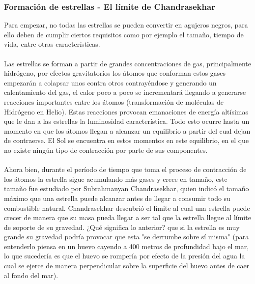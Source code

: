 \documentclass[12pt]{article}
\begin{document}
\subsubsection{Formación de estrellas - El límite de Chandrasekhar}
Para empezar, no todas las estrellas se pueden convertir en agujeros negros, para ello deben de cumplir ciertos requisitos como por ejemplo el tamaño, tiempo de vida, entre otras características.
\\\\
Las estrellas se forman a partir de grandes concentraciones de gas, principalmente hidrógeno, por efectos gravitatorios los átomos que conforman estos gases empezarán a colapsar unos contra otros contrayéndose y generando un calentamiento del gas, el calor poco a poco se incrementará llegando a generarse reacciones importantes entre los átomos (transformación de moléculas de Hidrógeno en Helio). Estas reacciones provocan emanaciones de energía altísimas que le dan a las estrellas la luminosidad característica. Todo esto ocurre hasta un momento en que los átomos llegan a alcanzar un equilibrio a partir del cual dejan de contraerse. El Sol se encuentra en estos momentos en este equilibrio, en el que no existe ningún tipo de contracción por parte de sus componentes.\\\\
Ahora bien, durante el período de tiempo que toma el proceso de contracción de los átomos la estrella sigue acumulando más gases y crece en tamaño, este tamaño fue estudiado por Subrahmanyan Chandrasekhar, quien indicó el tamaño máximo que una estrella puede alcanzar antes de llegar a consumir todo su combustible natural. Chandrasekhar descubrió el límite al cual una estrella puede crecer de manera que su masa pueda llegar a ser tal que la estrella llegue al límite de soporte de su gravedad. ¿Qué significa lo anterior? que si la estrella es muy grande su gravedad podría provocar que esta "se derrumbe sobre sí misma" (para entenderlo piensa en un huevo cayendo a 400 metros de profundidad bajo el mar, lo que sucedería es que el huevo se rompería por efecto de la presión del agua la cual se ejerce de manera perpendicular sobre la superficie del huevo antes de caer al fondo del mar).
\\\\
\end{document}
